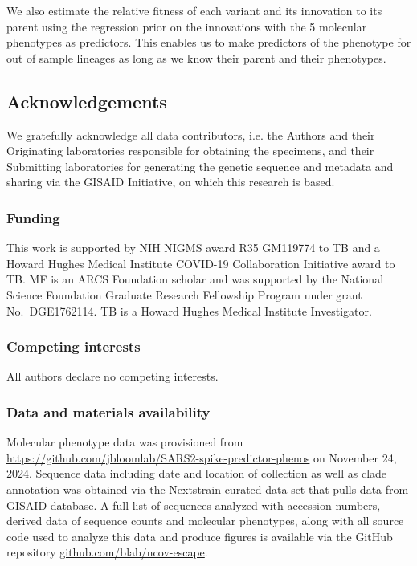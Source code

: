 We also estimate the relative fitness of each variant and its innovation to its parent using the regression prior on the innovations with the 5 molecular phenotypes as predictors.
This enables us to make predictors of the phenotype for out of sample lineages as long as we know their parent and their phenotypes.

\subsection*{Acknowledgements}

We gratefully acknowledge all data contributors, i.e. the Authors and their Originating laboratories responsible for obtaining the specimens, and their Submitting laboratories for generating the genetic sequence and metadata and sharing via the GISAID Initiative, on which this research is based.

\subsubsection*{Funding}

This work is supported by NIH NIGMS award R35 GM119774 to TB and a Howard Hughes Medical Institute COVID-19 Collaboration Initiative award to TB.
MF is an ARCS Foundation scholar and was supported by the National Science Foundation Graduate Research Fellowship Program under grant No.\ DGE1762114.
TB is a Howard Hughes Medical Institute Investigator.

\subsubsection*{Competing interests}

All authors declare no competing interests.

\subsubsection*{Data and materials availability}

Molecular phenotype data was provisioned from \href{https://github.com/jbloomlab/SARS2-spike-predictor-phenos}{https://github.com/jbloomlab/SARS2-spike-predictor-phenos} on November 24, 2024.
Sequence data including date and location of collection as well as clade annotation was obtained via the Nextstrain-curated data set that pulls data from GISAID database.
A full list of sequences analyzed with accession numbers, derived data of sequence counts and molecular phenotypes, along with all source code used to analyze this data and produce figures is available via the GitHub repository \href{https://github.com/blab/ncov-escape}{github.com/blab/ncov-escape}.
